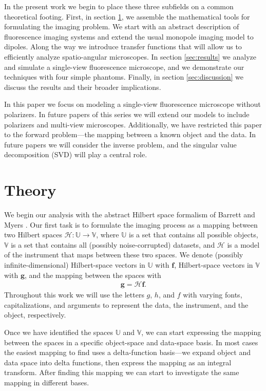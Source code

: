 \documentclass[]{osa-article}
\providecommand{\mb}[1]{\mathbf{#1}}
\providecommand{\mc}[1]{\mathcal{#1}}
\providecommand{\mbb}[1]{\mathbb{#1}}
\begin{document}
In the present work we begin to place these three subfields on a common
theoretical footing. First, in section \ref{sec:theory}, we assemble the
mathematical tools for formulating the imaging problem. We start with an
abstract description of fluorescence imaging systems and extend the usual
monopole imaging model to dipoles. Along the way we introduce transfer functions
that will allow us to efficiently analyze spatio-angular microscopes. In section
\ref{sec:results} we analyze and simulate a single-view fluorescence microscope,
and we demonstrate our techniques with four simple phantoms. Finally, in section
\ref{sec:discussion} we discuss the results and their broader implications.

In this paper we focus on modeling a single-view fluorescence microscope without
polarizers. In future papers of this series we will extend our models to include
polarizers and multi-view microscopes. Additionally, we have restricted this
paper to the forward problem---the mapping between a known object and the data.
In future papers we will consider the inverse problem, and the singular value
decomposition (SVD) will play a central role.
 
\section{Theory}\label{sec:theory}
We begin our analysis with the abstract Hilbert space formalism of Barrett and
Myers \cite[ch.~1.3]{barrett2004}. Our first task is to formulate
the imaging process as a mapping between two Hilbert spaces
$\mc{H}: \mbb{U} \rightarrow \mbb{V}$, where $\mbb{U}$ is a set that contains
all possible objects, $\mbb{V}$ is a set that contains all (possibly
noise-corrupted) datasets, and $\mc{H}$ is a model of the instrument that maps
between these two spaces. We denote (possibly infinite-dimensional)
Hilbert-space vectors in $\mbb{U}$ with $\mb{f}$, Hilbert-space vectors in
$\mbb{V}$ with $\mb{g}$, and the mapping between the spaces with
\begin{align}
  \mb{g} = \mc{H}\mb{f}.
\end{align}
Throughout this work we will use the letters $g$, $h$, and $f$ with varying
fonts, capitalizations, and arguments to represent the data, the instrument, and
the object, respectively.

Once we have identified the spaces $\mbb{U}$ and $\mbb{V}$, we can start
expressing the mapping between the spaces in a specific object-space and
data-space basis. In most cases the easiest mapping to find uses a
delta-function basis---we expand object and data space into delta functions,
then express the mapping as an integral transform. After finding this mapping we
can start to investigate the same mapping in different bases.
\end{document}
